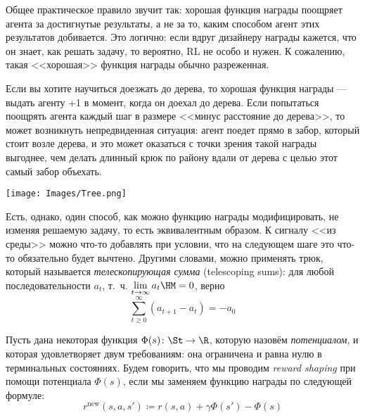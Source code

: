 Общее практическое правило звучит так: хорошая функция награды поощряет агента за достигнутые результаты, а не за то, каким способом агент этих результатов добивается. Это логично: если вдруг дизайнеру награды кажется, что он знает, как решать задачу, то вероятно, RL не особо и нужен. К сожалению, такая <<хорошая>> функция награды обычно разреженная.

\begin{exampleBox}[righthand ratio=0.35, sidebyside, sidebyside align=center, lower separated=false]{}
Если вы хотите научиться доезжать до дерева, то хорошая функция награды --- выдать агенту +1 в момент, когда он доехал до дерева. Если попытаться поощрять агента каждый шаг в размере <<минус расстояние до дерева>>, то может возникнуть непредвиденная ситуация: агент поедет прямо в забор, который стоит возле дерева, и это может оказаться с точки зрения такой награды выгоднее, чем делать длинный крюк по району вдали от дерева с целью этот самый забор объехать. 

\tcblower
\texttt{[image: Images/Tree.png]}
\end{exampleBox}

Есть, однако, один способ, как можно функцию награды модифицировать, не изменяя решаемую задачу, то есть эквивалентным образом. К сигналу <<из среды>> можно что-то добавлять при условии, что на следующем шаге это что-то обязательно будет вычтено. Другими словами, можно применять трюк, который называется \emph{телескопирующая сумма} (telescoping sums): для любой последовательности $a_t$, т.~ч. $\lim\limits_{t \to \infty} a_t \HM= 0$, верно
\begin{equation}\label{telescopingsum}
    \sum_{t \ge 0}^\infty \left( a_{t+1} - a_t \right) = -a_0
\end{equation}

\begin{definition}
Пусть дана некоторая функция $\Phi(s) \colon \St \to \R$, которую назовём \emph{потенциалом}, и которая удовлетворяет двум требованиям: она ограничена и равна нулю в терминальных состояниях. Будем говорить, что мы проводим \emph{reward shaping} при помощи потенциала $\Phi(s)$, если мы заменяем функцию награды по следующей формуле:
\begin{equation}\label{rewardshaping}
r^{\mathrm{new}}(s, a, s') \coloneqq r(s, a) + \gamma \Phi(s') - \Phi(s)    
\end{equation}
\end{definition}

